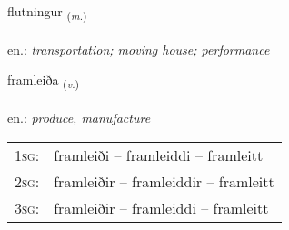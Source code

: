 \documentclass[frontgrid, backgrid]{flacards}\usepackage[]{graphicx}\usepackage[]{xcolor}
\begin{document}
\renewcommand{\flhead}{\vskip5pt \fboxsep=0pt {\small\bfseries\footnotesize Nafnorð | Noun}}
\renewcommand{\fcfoot}{\vskip5pt \fboxsep=0pt \hspace{2pt}{\small\bfseries\footnotesize 2K}}

\renewcommand{\blhead}{\vskip5pt {\small\bfseries\footnotesize Nafnorð | Noun }}
\renewcommand{\bcfoot}{\vskip5pt \hspace{2pt}{\small\bfseries\footnotesize 2K}}


{flutningur \small{\textsubscript{(\textit{m.})}} \\[1ex] %
\textphonetic{[flʏhtniŋkʏr]} \\
en.: \emph{transportation; moving house; performance} \\  [2ex]
\renewcommand*{\arraystretch}{0.8}
}

\renewcommand{\flhead}{\vskip5pt \fboxsep=0pt {\small\bfseries\footnotesize Sagnorð | Verb}}
\renewcommand{\fcfoot}{\vskip5pt \fboxsep=0pt \hspace{2pt}{\small\bfseries\footnotesize 2K}}

\renewcommand{\blhead}{\vskip5pt {\small\bfseries\footnotesize Sagnorð | Verb }}
\renewcommand{\bcfoot}{\vskip5pt \hspace{2pt}{\small\bfseries\footnotesize 2K}}


{framleiða \small{\textsubscript{(\textit{v.})}} \\[1ex] %
\textphonetic{[framleiða]} \\
en.: \emph{produce, manufacture} \\  [2ex]
\renewcommand*{\arraystretch}{0.8}
\begin{tabular}{p{1cm}l}
\textsc{1sg}: & framleiði -- framleiddi -- framleitt \\ 
\textsc{2sg}: & framleiðir -- framleiddir -- framleitt \\ 
\textsc{3sg}: & framleiðir -- framleiddi -- framleitt \\ 
\end{tabular}
}
\end{document}
